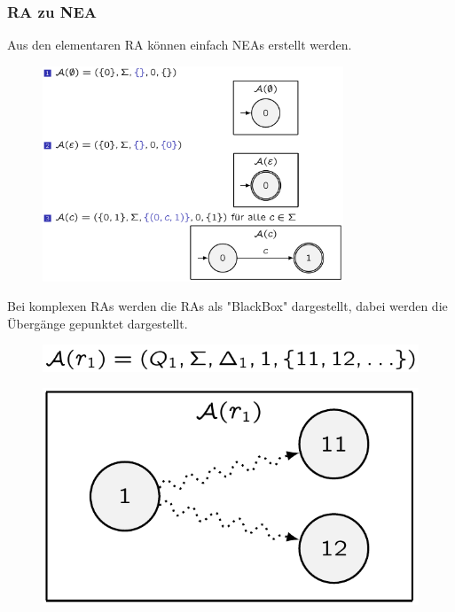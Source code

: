 \documentclass[12pt,a4paper]{article}
\begin{document}
\subsubsection{RA zu NEA}
Aus den elementaren RA können einfach NEAs erstellt werden.
\begin{center}
	\begin{figure}[!h]
		\includegraphics[width=0.8\textwidth]{Bilder/ElementareRAzuDEA.png}
	\end{figure}
\end{center}
Bei komplexen RAs werden die RAs als "BlackBox" dargestellt, dabei werden die Übergänge gepunktet dargestellt.

\begin{center}
	\begin{figure}[!h]
		\includegraphics[width=.7\textwidth]{Bilder/KomplexeRABeispiel.png}
	\end{figure}
\end{center}

\begin{center}
	\begin{figure}[!h]
		\includegraphics[width=.7\textwidth]{Bilder/BlackBoxExample.png}
	\end{figure}
\end{center}
\end{document}
